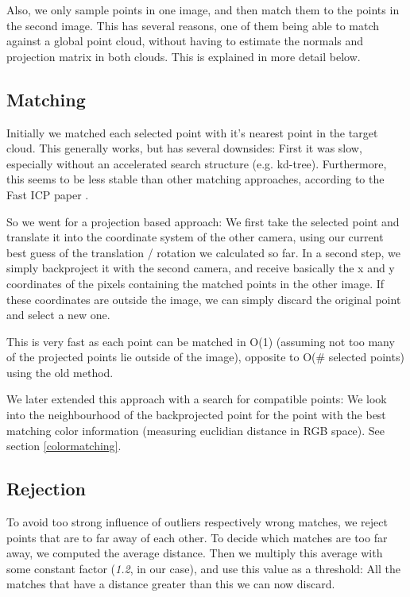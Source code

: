 \documentclass[10pt,twocolumn,letterpaper]{article}
\begin{document}
Also, we only sample points in one image, and then match them to the points in the second image. This has several reasons, one of them
being able to match against a global point cloud, without having to estimate the normals and projection matrix in both clouds.
This is explained in more detail below.

\subsection{Matching}
\label{backprojection}

Initially we matched each selected point with it's nearest point in the target cloud. 
This generally works, but has several downsides: First it was slow, especially without an accelerated search structure (e.g. kd-tree). 
Furthermore, this seems to be less stable than other matching approaches, according to the Fast ICP paper \cite{fasticp}.

So we went for a projection based approach: We first take the selected point and translate it into the coordinate system of the other camera,
using our current best guess of the translation / rotation we calculated so far. In a second step, we simply backproject it with the second camera,
and receive basically the x and y coordinates of the pixels containing the matched points in the other image. If these coordinates are outside the image,
we can simply discard the original point and select a new one.

This is very fast as each point can be matched in O(1) (assuming not too many of the projected points lie outside of the image), opposite to
O(\# selected points) using the old method.

We later extended this approach with a search for compatible points: We look into the neighbourhood of the backprojected point
for the point with the best matching color information (measuring euclidian distance in RGB space). See section \ref{colormatching}.

\subsection{Rejection}
To avoid too strong influence of outliers respectively wrong matches, we reject points that are to far away of each other. 
To decide which matches are too far away, we computed the average distance. Then we multiply this average with some constant
factor (\textit{1.2}, in our case), and use this value as a threshold: All the matches that have a distance greater than this
we can now discard.
\end{document}
